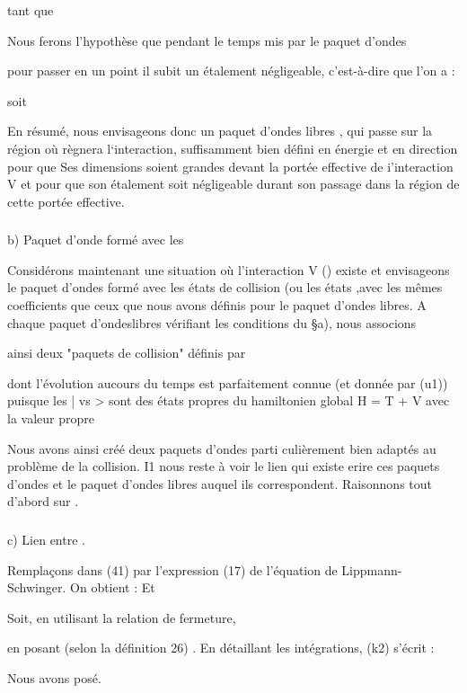 tant que 

Nous ferons l'hypothèse que pendant le temps mis par le paquet d'ondes

pour passer en un point  il subit un étalement négligeable,
c'est-à-dire que l'on a :

 soit 

En résumé, nous envisageons donc un paquet d'ondes libres  , qui
passe sur la région où règnera l‘interaction, suffisamment bien défini en
énergie et en direction pour que Ses dimensions soient grandes devant la
portée effective de i'interaction V et pour que son étalement soit négligeable
durant son passage dans la région de cette portée effective.

\subsubsection{}%
b) Paquet d'onde formé avec les

Considérons maintenant une situation où l'interaction V ()
existe et envisageons le paquet d'ondes formé avec les états de collision
 (ou les états ,avec les mêmes coefficients  que
ceux que nous avons définis pour le paquet d'ondes libres. A chaque paquet
d'ondeslibres  vérifiant les conditions du \S a), nous associons

ainsi deux "paquets de collision"  définis par


dont l'évolution aucours du temps est parfaitement connue (et donnée par
(u1)) puisque les | vs > sont des états propres du hamiltonien global
H = T + V avec la valeur propre 

Nous avons ainsi créé deux paquets d'ondes  parti
culièrement bien adaptés au problème de la collision. I1 nous reste à voir
le lien qui existe erire ces paquets d'ondes et le paquet d'ondes libres
 auquel ils correspondent. Raisonnons tout d'abord sur .
 
\subsubsection{}%
c) Lien entre .

Remplaçons dans (41) par l'expression (17) de l'équation de Lippmann-Schwinger.
On obtient : Et

Soit, en utilisant la relation de fermeture,

en posant
 (selon la définition 26) .
En détaillant les intégrations, (k2) s'écrit :

Nous avons posé.


